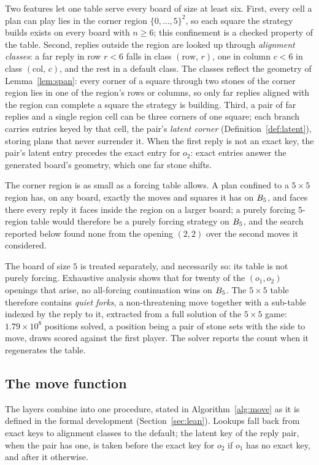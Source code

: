 \documentclass[11pt]{amsart}
\theoremstyle{definition}
\theoremstyle{remark}
\begin{document}
Two features let one table serve every board of size at least six.
First, every cell a plan
can play lies in the corner region $\{0,\dots,5\}^2$, so each square
the strategy builds exists on every board with $n \ge 6$; this
confinement is a checked property of the table. Second, replies
outside the region are looked up through \emph{alignment classes}: a
far reply in row $r < 6$ falls in class $(\mathrm{row},\, r)$, one in
column $c < 6$ in class $(\mathrm{col},\, c)$, and the rest in a
default class. The classes reflect the geometry of
Lemma~\ref{lem:span}: every corner of a square through two stones of
the corner region lies in one of the region's rows or columns, so only
far replies aligned with the region can complete a square the strategy
is building. Third, a pair of far replies and a single region cell can be
three corners of one square; each branch carries entries keyed by
that cell, the pair's \emph{latent corner}
(Definition~\ref{def:latent}), storing plans that never surrender
it. When the first reply is not an exact key, the pair's latent
entry precedes the exact entry for $o_2$: exact entries answer the
generated board's geometry, which one far stone shifts.

The corner region is as small as a forcing table allows. A plan
confined to a $5 \times 5$ region has, on any board, exactly the
moves and squares it has on $B_5$, and faces there every reply
it faces inside the region on a larger board; a purely forcing
$5$-region table would therefore be a purely forcing strategy on
$B_5$, and the search reported below found none from the opening
$(2,2)$ over the second moves it considered.

The board of size $5$ is treated separately, and necessarily so: its
table is not purely forcing. Exhaustive analysis shows that for
twenty of the $(o_1, o_2)$ openings that arise, no all-forcing
continuation wins on $B_5$. The $5 \times 5$ table therefore
contains \emph{quiet forks}, a non-threatening move together with a
sub-table indexed by the reply to it, extracted from a full solution
of the $5 \times 5$ game: $1.79 \times 10^8$ positions solved, a
position being a pair of stone sets with the side to move, draws
scored against the first player. The solver reports the count when
it regenerates the table.

\subsection{The move function}
The layers combine into one procedure, stated in
Algorithm~\ref{alg:move} as it is defined in the formal development
(Section~\ref{sec:lean}). Lookups fall back from exact keys to
alignment classes to the default; the latent key of the reply pair,
when the pair has one, is taken before the exact key for $o_2$ if
$o_1$ has no exact key, and after it otherwise.
\end{document}
